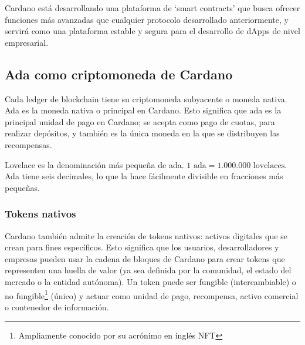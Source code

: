 \documentclass[12pt]{book}
\begin{document}
Cardano está desarrollando una plataforma de `smart contracts' que busca ofrecer funciones más avanzadas que cualquier protocolo desarrollado anteriormente, y servirá como una plataforma estable y segura para el desarrollo de dApps de nivel empresarial.

\subsection{Ada como criptomoneda de Cardano}


Cada ledger de blockchain tiene su criptomoneda subyacente o moneda nativa. Ada es la moneda nativa o principal en Cardano. Esto significa que ada es la principal unidad de pago en Cardano; se acepta como pago de cuotas, para realizar depósitos, y también es la única moneda en la que se distribuyen las recompensas.

Lovelace es la denominación más pequeña de ada. $\boxed{ 1 \text{ ada} = 1.000.000 \text{ lovelaces}}$. Ada tiene seis decimales, lo que la hace fácilmente divisible en fracciones más pequeñas.

\subsubsection{Tokens nativos}

Cardano también admite la creación de tokens nativos: activos digitales que se crean para fines específicos. Esto significa que los usuarios, desarrolladores y empresas pueden usar la cadena de bloques de Cardano para crear tokens que representen una huella de valor (ya sea definida por la comunidad, el estado del mercado o la entidad autónoma). Un token puede ser fungible (intercambiable) o no fungible\footnote{Ampliamente conocido por su acrónimo en inglés NFT} (único) y actuar como unidad de pago, recompensa, activo comercial o contenedor de información.



\end{document}
